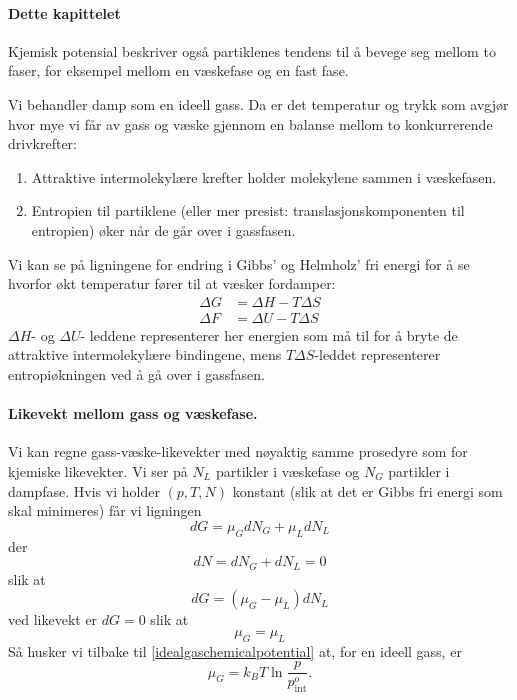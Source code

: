 \paragraph{Dette kapittelet}
Kjemisk potensial beskriver også partiklenes tendens til å bevege seg mellom to faser, for eksempel mellom en væskefase og en fast fase.

\label{sec:vaporcompetingdrivingforces}
Vi behandler damp som en ideell gass. Da er det temperatur og trykk som avgjør hvor mye vi får av gass og væske gjennom en balanse mellom to konkurrerende drivkrefter: 
\begin{enumerate}
	\item Attraktive intermolekylære krefter holder molekylene sammen i væskefasen.
	\item Entropien til partiklene (eller mer presist: trans\-lasjonskomponenten til entropien) øker når de går over i gassfasen.
\end{enumerate}
Vi kan se på ligningene for endring i Gibbs' og Helmholz' fri energi for å se hvorfor økt temperatur fører til at væsker fordamper:
\begin{align}
	\Delta G &= \Delta H - T\Delta S \\
	\Delta F &= \Delta U - T\Delta S
\end{align}
$\Delta H$- og $\Delta U$- leddene representerer her energien som må til for å bryte de attraktive intermolekylære bindingene, mens $T\Delta S$-leddet representerer entropiøkningen ved å gå over i gassfasen.

\paragraph{Likevekt mellom gass og væskefase.} Vi kan regne gass-væske-likevekter med nøyaktig samme prosedyre som for kjemiske likevekter. Vi ser på $N_L$ partikler i væskefase og $N_G$ partikler i dampfase. Hvis vi holder $(p,T,N)$ konstant (slik at det er Gibbs fri energi som skal minimeres) får vi ligningen
\begin{equation}
	dG=\mu_GdN_G+\mu_LdN_L
\end{equation}
der 
\begin{equation}
	dN = dN_G + dN_L = 0
\end{equation}
slik at
\begin{equation}
	dG=(\mu_G-\mu_L)dN_L
\end{equation}
ved likevekt er $dG=0$ slik at
\begin{equation}
	\label{vaporliquidequilibrium}
	\mu_G = \mu_L
\end{equation}
Så husker vi tilbake til \eqref{idealgaschemicalpotential} at, for en ideell gass, er
\begin{equation}
	\mu_G = k_BT\ln\frac{p}{p_{\text{int}}^o}.
\end{equation}

